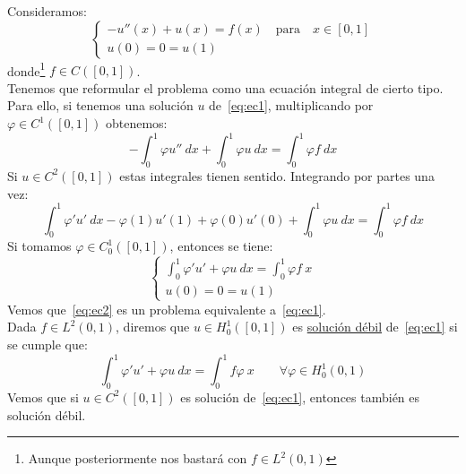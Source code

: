 \begin{ejemplo}
    Consideramos:
    \begin{equation}\label{eq:ec1}
        \left\{\begin{array}{l}
            -u''(x) + u(x) = f(x) \quad \text{para}\quad x\in [0,1] \\
            u(0) = 0 = u(1)
        \end{array}\right.
    \end{equation}
    donde\footnote{Aunque posteriormente nos bastará con $f\in L^2(0,1)$} $f\in C([0,1])$.\\

    \noindent
    Tenemos que reformular el problema como una ecuación integral de cierto tipo. Para ello, si tenemos una solución $u$ de~\eqref{eq:ec1}, multiplicando por $\varphi \in C^1([0,1])$ obtenemos:
    \begin{equation*}
        -\int_{0}^{1} \varphi u ''~dx  + \int_{0}^{1} \varphi u~dx  = \int_{0}^{1} \varphi f~dx 
    \end{equation*}
    Si $u\in C^2([0,1])$ estas integrales tienen sentido. Integrando por partes una vez:
    \begin{equation*}
        \int_{0}^{1} \varphi'u'~dx - \varphi(1)u'(1) + \varphi(0)u'(0) + \int_{0}^{1} \varphi u~dx  = \int_{0}^{1} \varphi f~dx 
    \end{equation*}
    Si tomamos $\varphi \in C_0^1([0,1])$, entonces se tiene:
    \begin{equation}\label{eq:ec2}
        \left\{\begin{array}{l}
            \int_{0}^{1} \varphi'u'+\varphi u~dx   = \int_{0}^{1}\varphi f ~x \\
            u(0) = 0 = u(1)
        \end{array}\right.
    \end{equation}
    Vemos que~\eqref{eq:ec2} es un problema equivalente a~\eqref{eq:ec1}.\\

    \noindent
    Dada $f\in L^2(0,1)$, diremos que $u\in H_0^1([0,1])$ es \underline{solución débil} de~\eqref{eq:ec1} si se cumple que:
    \begin{equation*}
        \int_{0}^{1} \varphi'u' + \varphi u~dx   = \int_{0}^{1} f\varphi~x\qquad \forall \varphi \in H_0^1(0,1)
    \end{equation*}
    Vemos que si $u\in C^2([0,1])$ es solución de~\eqref{eq:ec1}, entonces también es solución débil.\\


\end{ejemplo}
